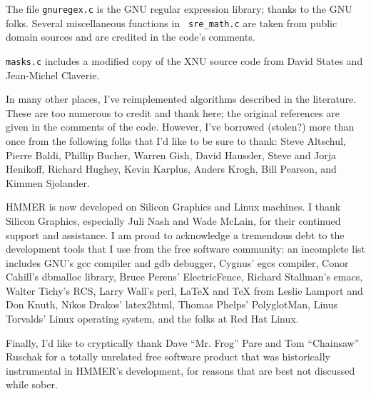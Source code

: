 The file {\tt gnuregex.c} is the GNU regular expression library;
thanks to the GNU folks. Several miscellaneous functions in {\tt
sre\_math.c} are taken from public domain sources and are credited in
the code's comments.

{\tt masks.c} includes a modified copy of the XNU source code from
David States and Jean-Michel Claverie.

In many other places, I've reimplemented algorithms described in the
literature. These are too numerous to credit and thank here; the
original references are given in the comments of the code. However,
I've borrowed (stolen?) more than once from the following folks that
I'd like to be sure to thank: Steve Altschul, Pierre Baldi, Phillip
Bucher, Warren Gish, David Haussler, Steve and Jorja Henikoff, Richard
Hughey, Kevin Karplus, Anders Krogh, Bill Pearson, and Kimmen
Sjolander.

HMMER is now developed on Silicon Graphics and Linux machines.  I
thank Silicon Graphics, especially Juli Nash and Wade McLain, for
their continued support and assistance. I am proud to acknowledge a
tremendous debt to the development tools that I use from the free
software community: an incomplete list includes GNU's gcc compiler and
gdb debugger, Cygnus' egcs compiler, Conor Cahill's dbmalloc library,
Bruce Perens' ElectricFence, Richard Stallman's emacs, Walter Tichy's
RCS, Larry Wall's perl, LaTeX and TeX from Leslie Lamport and Don
Knuth, Nikos Drakos' latex2html, Thomas Phelps' PolyglotMan, Linus
Torvalds' Linux operating system, and the folks at Red Hat Linux.

Finally, I'd like to cryptically thank Dave ``Mr. Frog'' Pare and Tom
``Chainsaw'' Ruschak for a totally unrelated free software product
that was historically instrumental in HMMER's development, for reasons
that are best not discussed while sober.
